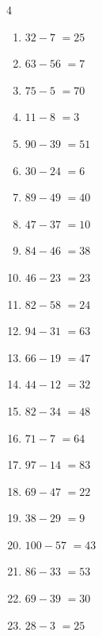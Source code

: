 \begin{multicols}{4}
\begin{enumerate}
  \item $32-7$
        $=25$

  \item $63-56$
        $=7$

  \item $75-5$
        $=70$

  \item $11-8$
        $=3$

  \item $90-39$
        $=51$

  \item $30-24$
        $=6$

  \item $89-49$
        $=40$

  \item $47-37$
        $=10$

  \item $84-46$
        $=38$

\columnbreak %

  \item $46-23$
        $=23$

  \item $82-58$
        $=24$

  \item $94-31$
        $=63$

  \item $66-19$
        $=47$

  \item $44-12$
        $=32$

  \item $82-34$
        $=48$

  \item $71-7$
        $=64$

  \item $97-14$
        $=83$

  \item $69-47$
        $=22$

  \item $38-29$
        $=9$

  \item $100-57$
        $=43$

  \item $86-33$
        $=53$

  \item $69-39$
        $=30$

  \item $28-3$
        $=25$


\end{enumerate}
\end{multicols}
